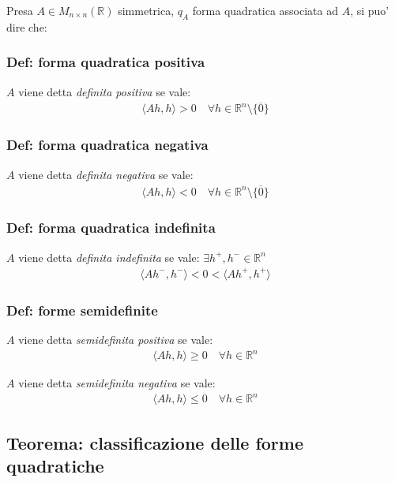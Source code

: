 \documentclass{article}
\begin{document}
\noindent Presa $A \in M_{n \times n} (\mathbb{R})$ simmetrica, $q_A$ forma
quadratica associata ad $A$, si puo' dire che:

\subsubsection{Def: forma quadratica positiva}

$A$ viene detta \emph{definita positiva} se vale:
\begin{align*}
  \langle Ah, h \rangle > 0 \quad \forall h \in \mathbb{R}^n\setminus\{\overline{0}\}
\end{align*}

\subsubsection{Def: forma quadratica negativa}

$A$ viene detta \emph{definita negativa} se vale:
\begin{align*}
  \langle Ah, h \rangle < 0 \quad \forall h \in \mathbb{R}^n\setminus\{\overline{0}\}
\end{align*}

\subsubsection{Def: forma quadratica indefinita}

$A$ viene detta \emph{definita indefinita} se vale: $\exists h^+, h^- \in \mathbb{R}^n$
\begin{align*}
  \langle Ah^-, h^- \rangle < 0 < \langle Ah^+, h^+ \rangle
\end{align*}

\subsubsection{Def: forme semidefinite}

$A$ viene detta \emph{semidefinita positiva} se vale:
\begin{align*}
  \langle Ah, h \rangle \geq 0 \quad \forall h \in \mathbb{R}^n
\end{align*}

\noindent $A$ viene detta \emph{semidefinita negativa} se vale:
\begin{align*}
  \langle Ah, h \rangle \leq 0 \quad \forall h \in \mathbb{R}^n
\end{align*}

\subsection{Teorema: classificazione delle forme quadratiche}
\end{document}
